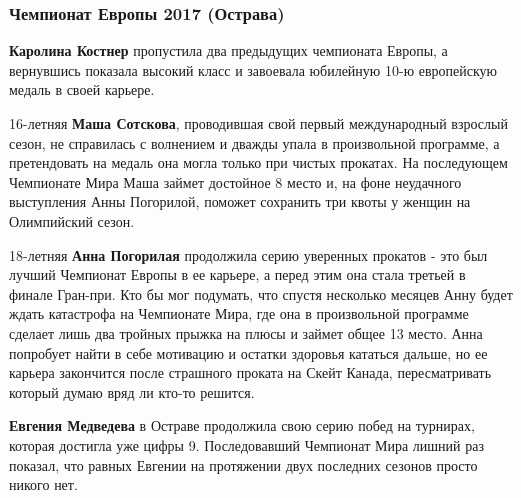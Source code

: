  
 
 
 
 
\subsubsection{Чемпионат Европы 2017 (Острава)}
\label{sec:04_01_2022.yz.figurka_ot_maksima_jagudina.1.chempionaty_evropy.7.ostrava_2017}

\textbf{Каролина Костнер} пропустила два предыдущих чемпионата Европы, а вернувшись
показала высокий класс и завоевала юбилейную 10-ю европейскую медаль в своей
карьере.


16-летняя \textbf{Маша Сотскова}, проводившая свой первый международный
взрослый сезон, не справилась с волнением и дважды упала в произвольной
программе, а претендовать на медаль она могла только при чистых прокатах. На
последующем Чемпионате Мира Маша займет достойное 8 место и, на фоне неудачного
выступления Анны Погорилой, поможет сохранить три квоты у женщин на Олимпийский
сезон.


18-летняя \textbf{Анна Погорилая} продолжила серию уверенных прокатов - это был
лучший Чемпионат Европы в ее карьере, а перед этим она стала третьей в финале
Гран-при. Кто бы мог подумать, что спустя несколько месяцев Анну будет ждать
катастрофа на Чемпионате Мира, где она в произвольной программе сделает лишь
два тройных прыжка на плюсы и займет общее 13 место. Анна попробует найти в
себе мотивацию и остатки здоровья кататься дальше, но ее карьера закончится
после страшного проката на Скейт Канада, пересматривать который думаю вряд ли
кто-то решится.

\textbf{Евгения Медведева} в Остраве продолжила свою серию побед на турнирах,
которая достигла уже цифры 9. Последовавший Чемпионат Мира лишний раз показал,
что равных Евгении на протяжении двух последних сезонов просто никого нет.
